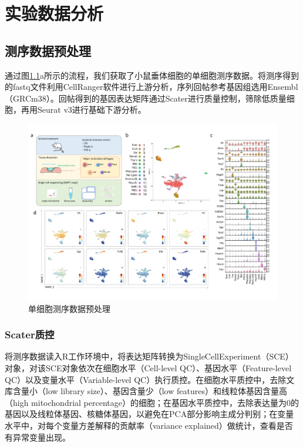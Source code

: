 
\chapter{实验数据分析}

\section{测序数据预处理}
  通过图\ref{fig:expr-fig1}a所示的流程，我们获取了小鼠垂体细胞的单细胞测序数据。将测序得到的fastq文件利用CellRanger软件进行上游分析，序列回帖参考基因组选用Ensembl（GRCm38）。回帖得到的基因表达矩阵通过Scater\cite{mccarthy2017scater}进行质量控制，筛除低质量细胞，再用Seurat v3\cite{butler2018integrating,stuart2019comprehensive}进行基础下游分析。

\begin{figure}[!htb]
  \centering
  \includegraphics[width=1.0\textwidth]{figs/expr-fig1.pdf}
  \caption{单细胞测序数据预处理}
  \label{fig:expr-fig1}
\end{figure}

\subsection{Scater质控}
  将测序数据读入R工作环境中，将表达矩阵转换为SingleCellExperiment（SCE）对象，对该SCE对象依次在细胞水平（Cell-level QC）、基因水平（Feature-level QC）以及变量水平（Variable-level QC）执行质控。在细胞水平质控中，去除文库含量小（low library size）、基因含量少（low features）和线粒体基因含量高（high mitochondrial percentage）的细胞；在基因水平质控中，去除表达量为0的基因以及线粒体基因、核糖体基因，以避免在PCA部分影响主成分判别；在变量水平中，对每个变量方差解释的贡献率（variance explained）做统计，查看是否有异常变量出现。


